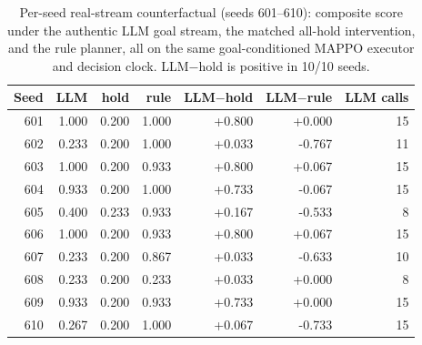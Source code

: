 \begin{table}[t]
\centering
\caption{Per-seed real-stream counterfactual (seeds 601--610): composite score under the authentic LLM goal stream, the matched all-hold intervention, and the rule planner, all on the same goal-conditioned MAPPO executor and decision clock. LLM$-$hold is positive in 10/10 seeds.}
\label{tab:p3aseed}
\footnotesize
\setlength{\tabcolsep}{4pt}
\begin{tabular}{@{}rrrrrrr@{}}
\toprule
Seed & LLM & hold & rule & LLM$-$hold & LLM$-$rule & LLM calls \\
\midrule
601 & 1.000 & 0.200 & 1.000 & +0.800 & +0.000 & 15 \\
602 & 0.233 & 0.200 & 1.000 & +0.033 & -0.767 & 11 \\
603 & 1.000 & 0.200 & 0.933 & +0.800 & +0.067 & 15 \\
604 & 0.933 & 0.200 & 1.000 & +0.733 & -0.067 & 15 \\
605 & 0.400 & 0.233 & 0.933 & +0.167 & -0.533 & 8 \\
606 & 1.000 & 0.200 & 0.933 & +0.800 & +0.067 & 15 \\
607 & 0.233 & 0.200 & 0.867 & +0.033 & -0.633 & 10 \\
608 & 0.233 & 0.200 & 0.233 & +0.033 & +0.000 & 8 \\
609 & 0.933 & 0.200 & 0.933 & +0.733 & +0.000 & 15 \\
610 & 0.267 & 0.200 & 1.000 & +0.067 & -0.733 & 15 \\
\bottomrule
\end{tabular}
\end{table}
